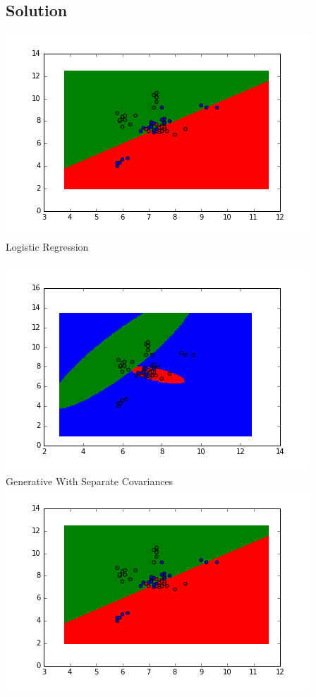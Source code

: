 \documentclass[submit]{harvardml}
\begin{document}
\subsection*{Solution}
\includegraphics{logistic_regression_result}\\
Logistic Regression\\
\\
\includegraphics{generative_result_separate_covariances}\\
Generative With Separate Covariances\\
\includegraphics{logistic_regression_result}\\
\end{document}
